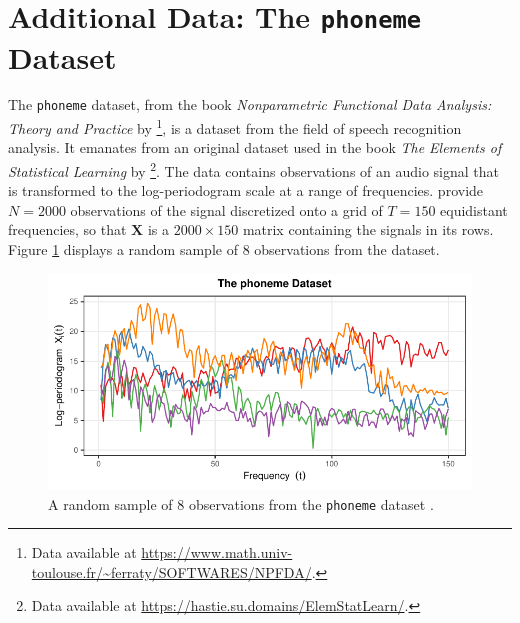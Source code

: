 \section{Additional Data: The \texttt{phoneme} Dataset}\label{sec:additional-data}

The \texttt{phoneme} dataset, from the book \emph{Nonparametric Functional Data Analysis: Theory and Practice} by \textcite{ferraty_nonparametric_2006}\footnote{Data available at \url{https://www.math.univ-toulouse.fr/~ferraty/SOFTWARES/NPFDA/}.}, is a dataset from the field of speech recognition analysis.
It emanates from an original dataset used in the book \emph{The Elements of Statistical Learning} by \textcite{hastie_elements_2009}\footnote{Data available at \url{https://hastie.su.domains/ElemStatLearn/}.}.
The data contains observations of an audio signal that is transformed to the log-periodogram scale at a range of frequencies.
\textcite{ferraty_nonparametric_2006} provide $N=2000$ observations of the signal discretized onto a grid of $T=150$ equidistant frequencies, so that $\mathbf{X}$ is a $2000\times 150$ matrix containing the signals in its rows.
Figure \ref{fig:phoneme} displays a random sample of $8$ observations from the dataset.

\begin{figure}[h]
    \centering
    \includegraphics[width=0.75\linewidth]{figures/phoneme.pdf}
    \caption{A random sample of $8$ observations from the \texttt{phoneme} dataset \parencite{hastie_elements_2009, ferraty_nonparametric_2006}.}
    \label{fig:phoneme}
\end{figure}

